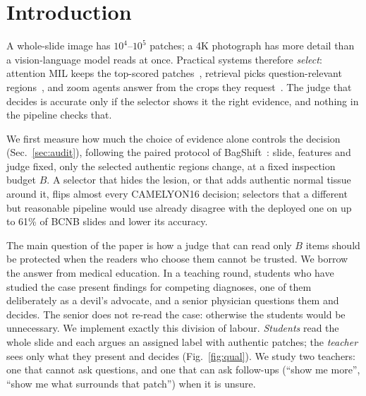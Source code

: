 \documentclass[10pt,twocolumn,letterpaper]{article}
\begin{document}
\section{Introduction}\label{sec:intro}
A whole-slide image has $10^4$--$10^5$ patches; a 4K photograph has more detail than a vision-language model reads at once. Practical systems therefore \emph{select}: attention MIL keeps the top-scored patches~\cite{ilse2018abmil}, retrieval picks question-relevant regions~\cite{beacon2026}, and zoom agents answer from the crops they request~\cite{wu2024vstar,zheng2025deepeyes}. The judge that decides is accurate only if the selector shows it the right evidence, and nothing in the pipeline checks that.

We first measure how much the choice of evidence alone controls the decision (Sec.~\ref{sec:audit}), following the paired protocol of BagShift~\cite{bagshift2026}: slide, features and judge fixed, only the selected authentic regions change, at a fixed inspection budget $B$. A selector that hides the lesion, or that adds authentic normal tissue around it, flips almost every CAMELYON16 decision; selectors that a different but reasonable pipeline would use already disagree with the deployed one on up to 61\% of BCNB slides and lower its accuracy.

The main question of the paper is how a judge that can read only $B$ items should be protected when the readers who choose them cannot be trusted. We borrow the answer from medical education. In a teaching round, students who have studied the case present findings for competing diagnoses, one of them deliberately as a devil's advocate, and a senior physician questions them and decides. The senior does not re-read the case: otherwise the students would be unnecessary. We implement exactly this division of labour. \emph{Students} read the whole slide and each argues an assigned label with authentic patches; the \emph{teacher} sees only what they present and decides (Fig.~\ref{fig:qual}). We study two teachers: one that cannot ask questions, and one that can ask follow-ups (``show me more'', ``show me what surrounds that patch'') when it is unsure.
\end{document}
